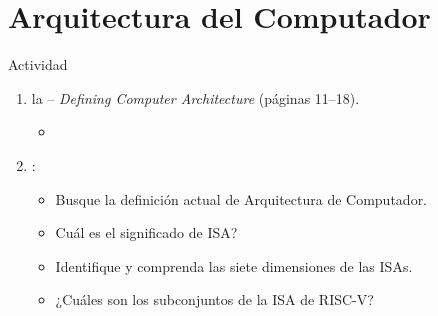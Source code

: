 \section{Arquitectura del Computador}

\begin{frame}[t]{Actividad}
\begin{enumerate}
  \item {} la  -- 
        \emph{Defining Computer Architecture} (páginas 11--18).
    \begin{itemize}
      \item \credithennessy
    \end{itemize}

  \item {}:
    \begin{itemize}
      \item Busque la definición actual de Arquitectura de Computador.
      \item Cuál es el significado de ISA?
      \item Identifique y comprenda las siete dimensiones de las ISAs.
      \item ¿Cuáles son los subconjuntos de la ISA de RISC-V?
    \end{itemize}
\end{enumerate}
\end{frame}
